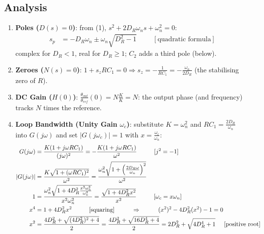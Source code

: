 \subsection{Analysis}
\begin{enumerate}
  \item \textbf{Poles (\(D(s) = 0\))}: from (1), \(s^2 + 2D_R\omega_n s + \omega_n^2 = 0\):
    \begin{align*}
      s_p &= -D_R\omega_n \pm \omega_n\sqrt{D_R^2 - 1} \hspace{1cm} [\text{quadratic formula}]
    \end{align*}
    complex for \(D_R < 1\), real for \(D_R \geq 1\); \(C_2\) adds a third pole (below).
  \item \textbf{Zeroes (\(N(s) = 0\))}: \(1 + s_z RC_1 = 0 \Rightarrow s_z = -\frac{1}{RC_1} = -\frac{\omega_n}{2D_R}\) (the stabilising zero of \(R\)).
  \item \textbf{DC Gain (\(H(0)\))}: \(\frac{\theta_{out}}{\theta_{ref}}(0) = N\frac{K}{K} = N\): the output phase (and frequency) tracks
    \(N\) times the reference.
  \item \textbf{Loop Bandwidth (Unity Gain \(\omega_c\))}: substitute \(K = \omega_n^2\) and
    \(RC_1 = \frac{2D_R}{\omega_n}\) into \(G(j\omega)\) and set \(|G(j\omega_c)| = 1\)
    with \(x = \frac{\omega_c}{\omega_n}\):
    \begin{align*}
      G(j\omega) &= \frac{K(1 + j\omega RC_1)}{(j\omega)^2} = -\frac{K(1 + j\omega RC_1)}{\omega^2} \hspace{1cm} [j^2 = -1] \\
      |G(j\omega)| &= \frac{K\sqrt{1 + (\omega RC_1)^2}}{\omega^2} = \frac{\omega_n^2\sqrt{1 + \left(\frac{2D_R\omega}{\omega_n}\right)^2}}{\omega^2} \\
      1 &= \frac{\omega_n^2\sqrt{1 + 4D_R^2 \frac{x^2\omega_n^2}{\omega_n^2}}}{x^2\omega_n^2} = \frac{\sqrt{1 + 4D_R^2 x^2}}{x^2} \hspace{1cm} [\omega_c = x\omega_n] \\
      x^4 &= 1 + 4D_R^2 x^2 \hspace{1cm} [\text{squaring}] \hspace{1cm} \Rightarrow \hspace{1cm} (x^2)^2 - 4D_R^2 (x^2) - 1 = 0 \\
      x^2 &= \frac{4D_R^2 + \sqrt{(4D_R^2)^2 + 4}}{2} = \frac{4D_R^2 + \sqrt{16D_R^4 + 4}}{2} = 2D_R^2 + \sqrt{4D_R^4 + 1} \hspace{0.5cm} [\text{positive root}] \\

\end{align*}
\end{enumerate}
